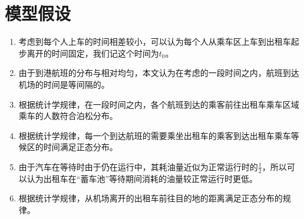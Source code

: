 \documentclass{cumcm}
\begin{document}
\section{模型假设}
\begin{enumerate}
	\item 考虑到每个人上车的时间相差较小，可以认为每个人从乘车区上车到出租车起步离开的时间固定，我们记这个时间为$t_0$。
	\item 由于到港航班的分布与相对均匀，本文认为在考虑的一段时间之内，航班到达机场的时间是等间隔的。
	\item 根据统计学规律，在一段时间之内，各个航班到达的乘客前往出租车乘车区域乘车的人数符合泊松分布。
	\item 根据统计学规律，每一个到达航班的需要乘坐出租车的乘客到达出租车乘车等候区的时间满足正态分布。
	\item 由于汽车在等待时由于仍在运行中，其耗油量近似为正常运行时的$\frac{1}{2}$，所以可以认为出租车在“蓄车池”等待期间消耗的油量较正常运行时更低。
	\item 根据统计学规律，从机场离开的出租车前往目的地的距离满足正态分布的规律。
\end{enumerate}

\newcommand{\flightnum}{$N_f$}
\newcommand{\taxinum}{$N_c$}
\newcommand{\waittime}{$t_w$}
\end{document}
